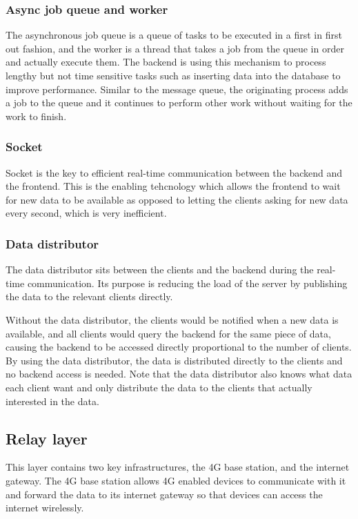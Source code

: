 \documentclass[../thesis.tex]{subfiles}
\begin{document}
\subsubsection{Async job queue and worker}

The asynchronous job queue is a queue of tasks to be executed in a first in first out fashion, and the worker is a thread that takes a job from the queue in order and actually execute them. The backend is using this mechanism to process lengthy but not time sensitive tasks such as inserting data into the database to improve performance. Similar to the message queue, the originating process adds a job to the queue and it continues to perform other work without waiting for the work to finish. 

\subsubsection{Socket}

Socket is the key to efficient real-time communication between the backend and the frontend. This is the enabling tehcnology which allows the frontend to wait for new data to be available as opposed to letting the clients asking for new data every second, which is very inefficient. 

\subsubsection{Data distributor}

The data distributor sits between the clients and the backend during the real-time communication. Its purpose is reducing the load of the server by publishing the data to the relevant clients directly. 

Without the data distributor, the clients would be notified when a new data is available, and all clients would query the backend for the same piece of data, causing the backend to be accessed directly proportional to the number of clients. By using the data distributor, the data is distributed directly to the clients and no backend access is needed. Note that the data distributor also knows what data each client want and only distribute the data to the clients that actually interested in the data. 

\subsection{Relay layer}

This layer contains two key infrastructures, the 4G base station, and the internet gateway. The 4G base station allows 4G enabled devices to communicate with it and forward the data to its internet gateway so that devices can access the internet wirelessly. 
\end{document}
